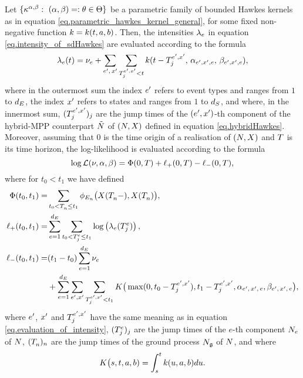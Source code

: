 \documentclass[10pt, article,table]{article}
\begin{document}
\begin{prop}\label{prop.parametric_hawkes_kernels}
 Let $\lbrace\hawkesKernel^{\impCoef, \decCoef} : \, \, (\impCoef,\decCoef)=:\theta \in \Theta \rbrace$ be a parametric family of bounded Hawkes kernels as in equation \eqref{eq.parametric_hawkes_kernel_general}, for some fixed non-negative function $\parametricHawkesKernel=\parametricHawkesKernel(t,a,b)$. Then, the intensities $\intensity[e]$ in equation \eqref{eq.intensity_of_sdHawkes} are evaluated according to the formula
 \begin{equation}\label{eq.evaluation_of_intensity}
 \intensity(t) = \baseRate_e 
 +\sum_{\eone, \, \xone} \sum_{\arrivalTimes[\eone, \xone]_{j} < t} 
 \parametricHawkesKernel(t-\arrivalTimes[\eone, \xone]_{j}, \, \impCoef_{\eone,\xone, e}, \,  \decCoef_{\eone,\xone, e}),
\end{equation}
where in the outermost sum the index $\eone$ refers to event types and ranges from $1$ to $\numEventTypes$, the index $\xone$ refers to states and ranges from $1$ to $\numStates$, and where, in the innermost sum, $(\arrivalTimes[\eone, \xone]_{j})_j$ are the jump times of the $(\eone, \xone)$-th component of the hybrid-MPP counterpart $\hybridHawkes$ of $(\multiCountingProc,\stateVariable)$ defined in equation \eqref{eq.hybridHawkes}. Moreover, assuming that $0$ is the time origin of a realisation of $(\multiCountingProc, \stateVariable)$ and $\timeHorizon$ is its time horizon,  the log-likelihood is evaluated according to the formula
\begin{equation}\label{eq.evaluation_of_loglikelihood}
 \log \likelihood(\baseRate,\impCoef,\decCoef) = \Phi(0,\timeHorizon)
 + \lplus(0,\timeHorizon) - \lminus(0,\timeHorizon), 
\end{equation}
where for $t_0 < t_1$ we have defined
\begin{equation*}
\begin{split}
 \Phi(t_0,t_1) =& \sum_{t_0<\arrivalTimes[]_n \leq t_1} \transProb_{\event}\big(\stateVariable(\arrivalTimes[]_n - ), \stateVariable(\arrivalTimes[]_n)\big), 
 \\
 \lplus(t_0,t_1) =& \sum_{e=1}^{\numEventTypes} \sum_{t_0<\arrivalTimes[e]_j\leq t_1} \log \left(\intensity[e](\arrivalTimes[e]_j)\right), 
 \\
 \lminus(t_0,t_1) =& (t_1-t_0)\sum_{e=1}^{\numEventTypes} \baseRate_e
 \\
 & +\sum_{e=1}^{\numEventTypes} 
 \sum_{\eone,\xone} \sum_{\arrivalTimes[\eone,\xone]_j < t_1}
 K\big(\max(0,t_0-\arrivalTimes[\eone,\xone]_j), t_1 - \arrivalTimes[\eone,\xone]_j,  \impCoef\subscriptexe, \decCoef\subscriptexe\big),
\end{split}
 \end{equation*}
where $\eone$, $\xone$ and $\arrivalTimes[\eone,\xone]_j$ have the same meaning as in equation \eqref{eq.evaluation_of_intensity}, $(\arrivalTimes[e]_j)_j$ are the jump times of the $e$-th component $\countingProc$ of $\multiCountingProc$, $(\arrivalTimes[]_n)_n$ are the jump times of the ground process $\groundProc$ of  $\multiCountingProc$, and where 
\begin{equation*}
 K\big(s,t, a, b) = \int_{s}^{t} \parametricHawkesKernel(u,a,b)du.
\end{equation*}
\end{prop}
\end{document}
